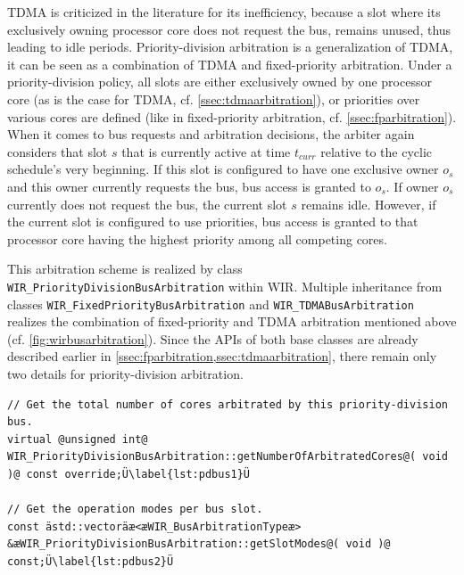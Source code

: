 \gls{TDMA} is criticized in the literature for its inefficiency, because a slot where its exclusively owning processor core does not request the bus, remains unused, thus leading to idle periods.
Priority-division arbitration is a generalization of \gls{TDMA}, it can be seen as a combination of \gls{TDMA} and fixed-priority arbitration.
Under a priority-division policy, all slots are either exclusively owned by one processor core (as is the case for \gls{TDMA}, cf. \cref{ssec:tdmaarbitration}), or priorities over various cores are defined (like in fixed-priority arbitration, cf. \cref{ssec:fparbitration}).
When it comes to bus requests and arbitration decisions, the arbiter again considers that slot $\mathit{s}$ that is currently active at time $\mathit{t}_\mathit{curr}$ relative to the cyclic schedule's very beginning.
If this slot is configured to have one exclusive owner $\mathit{o}_\mathit{s}$ and this owner currently requests the bus, bus access is granted to $\mathit{o}_\mathit{s}$.
If owner $\mathit{o}_\mathit{s}$ currently does not request the bus, the current slot $\mathit{s}$ remains idle.
However, if the current slot is configured to use priorities, bus access is granted to that processor core having the highest priority among all competing cores.

This arbitration scheme is realized by class \texttt{WIR\_PriorityDivisionBusArbitration} within \gls{WIR}.
Multiple inheritance from classes \texttt{WIR\_FixedPriorityBusArbitration} and \texttt{WIR\_TDMABusArbitration} realizes the combination of fixed-priority and \gls{TDMA} arbitration mentioned above (cf. \cref{fig:wirbusarbitration}).
Since the \glspl{API} of both base classes are already described earlier in \cref{ssec:fparbitration,ssec:tdmaarbitration}, there remain only two details for priority-division arbitration.

\begin{lstlisting}[style=code,float=h,caption={Characteristic Attributes of Class \texttt{WIR\_PriorityDivisionBusArbitration}},label=lst:pdbus]
// Get the total number of cores arbitrated by this priority-division bus.
virtual @unsigned int@ WIR_PriorityDivisionBusArbitration::getNumberOfArbitratedCores@( void )@ const override;Ü\label{lst:pdbus1}Ü

// Get the operation modes per bus slot.
const ästd::vectoräæ<æWIR_BusArbitrationTypeæ> &æWIR_PriorityDivisionBusArbitration::getSlotModes@( void )@ const;Ü\label{lst:pdbus2}Ü
\end{lstlisting}

